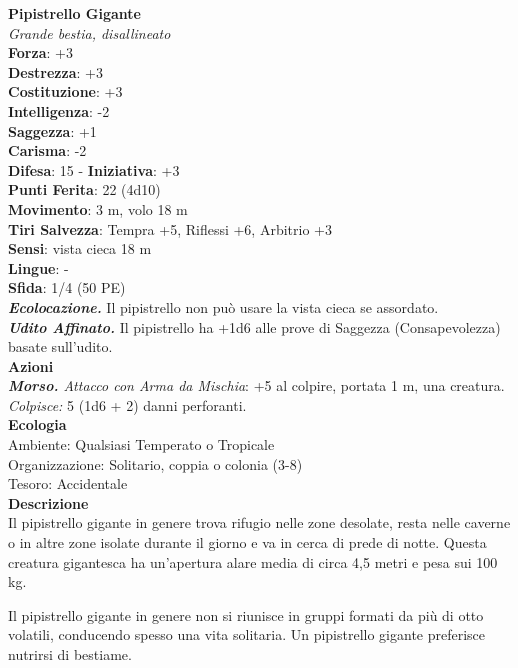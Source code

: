 \begin{multicols}{2}
\medskip\textbf{Pipistrello Gigante}\\
\emph{Grande bestia, disallineato}\\
\textbf{Forza}: +3\\
\textbf{Destrezza}: +3\\
\textbf{Costituzione}: +3\\
\textbf{Intelligenza}: -2\\
\textbf{Saggezza}: +1\\
\textbf{Carisma}: -2\\
\textbf{Difesa}: 15 - \textbf{Iniziativa}: +3\\
\textbf{Punti Ferita}: 22 (4d10)\\
\textbf{Movimento}: 3 m, volo 18 m\\
\textbf{Tiri Salvezza}: Tempra +5, Riflessi +6, Arbitrio +3 \\
\textbf{Sensi}: vista cieca 18 m\\
\textbf{Lingue}: -\\
\textbf{Sfida}: 1/4 (50 PE)\smallskip\\
\emph{\textbf{Ecolocazione.}} Il pipistrello non può usare la vista cieca se assordato.\\
\emph{\textbf{Udito Affinato.}} Il pipistrello ha +1d6 alle prove di Saggezza (Consapevolezza) basate sull'udito.\\
\smallskip\textbf{Azioni}\\
\emph{\textbf{Morso.} Attacco con Arma da Mischia}: +5 al colpire, portata 1 m, una creatura.\\
\emph{Colpisce:} 5 (1d6 + 2) danni perforanti.\\
\textbf{Ecologia}\\
Ambiente: Qualsiasi Temperato o Tropicale\\
Organizzazione: Solitario, coppia o colonia (3-8)\\
Tesoro: Accidentale \\
\textbf{Descrizione}\\

Il pipistrello gigante in genere trova rifugio nelle zone desolate, resta nelle caverne o in altre zone isolate durante il giorno e va in cerca di prede di notte. Questa creatura gigantesca ha un’apertura alare media di circa 4,5 metri e pesa sui 100 kg.

Il pipistrello gigante in genere non si riunisce in gruppi formati da più di otto volatili, conducendo spesso una vita solitaria. Un pipistrello gigante preferisce nutrirsi di bestiame. 


\end{multicols}
